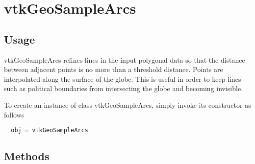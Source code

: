 \section{vtkGeoSampleArcs}

\subsection{Usage}

 vtkGeoSampleArcs refines lines in the input polygonal data
 so that the distance between adjacent points is no more than a threshold
 distance. Points are interpolated along the surface of the globe.
 This is useful in order to keep lines such as political boundaries from
 intersecting the globe and becoming invisible.

To create an instance of class vtkGeoSampleArcs, simply
invoke its constructor as follows
\begin{verbatim}
  obj = vtkGeoSampleArcs
\end{verbatim}
\subsection{Methods}


